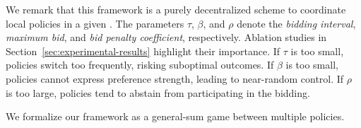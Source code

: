 We remark that this framework is a purely decentralized scheme to coordinate local policies in a given \momdp.
The parameters $\tau$, $\beta$, and $\rho$ denote the \emph{bidding interval}, \emph{maximum bid}, and \emph{bid penalty coefficient}, respectively. Ablation studies in Section~\ref{sec:experimental-results} highlight their importance. If $\tau$ is too small, policies switch too frequently, risking suboptimal outcomes. If $\beta$ is too small, policies cannot express preference strength, leading to near-random control. If $\rho$ is too large, policies tend to abstain from participating in the bidding.

We formalize our framework as a general-sum game between multiple policies.

